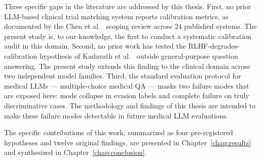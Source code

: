 Three specific gaps in the literature are addressed by this thesis. 
First, no prior LLM-based clinical trial matching system reports 
calibration metrics, as documented by the Chen et 
al.~\cite{chen2025scoping} scoping review across 24 published systems. 
The present study is, to our knowledge, the first to conduct a 
systematic calibration audit in this domain. Second, no prior work has 
tested the RLHF-degrades-calibration hypothesis of Kadavath et 
al.~\cite{kadavath2022know} outside general-purpose question answering. 
The present study extends this finding to the clinical domain across 
two independent model families. Third, the standard evaluation 
protocol for medical LLMs --- multiple-choice medical QA --- masks two 
failure modes that are exposed here: mode collapse in evasion labels 
and complete failure on truly discriminative cases. The methodology 
and findings of this thesis are intended to make these failure modes 
detectable in future medical LLM evaluations.

The specific contributions of this work, summarized as four 
pre-registered hypotheses and twelve original findings, are presented in 
Chapter~\ref{chap:results} and synthesized in 
Chapter~\ref{chap:conclusion}.